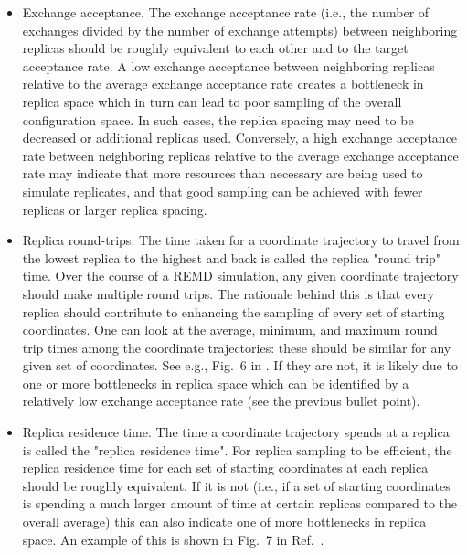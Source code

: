 \begin{itemize}
  \item Exchange acceptance. The exchange acceptance rate (i.e., the number of exchanges divided by the number of exchange attempts) between neighboring replicas should be roughly equivalent to each other and to the target acceptance rate. A low exchange acceptance between neighboring replicas relative to the average exchange acceptance rate creates a bottleneck in replica space which in turn can lead to poor sampling of the overall configuration space.  In such cases, the replica spacing may need to be decreased or additional replicas used.  Conversely, a high exchange acceptance rate between neighboring replicas relative to the average exchange acceptance rate may indicate that more resources than necessary are being used to simulate replicates, and that good sampling can be achieved with fewer replicas or larger replica spacing.  
  \item Replica round-trips. The time taken for a coordinate trajectory to travel from the lowest replica to the highest and back is called the replica "round trip" time. Over the course of a REMD simulation, any given coordinate trajectory should make multiple round trips. The rationale behind this is that every replica should contribute to enhancing the sampling of every set of starting coordinates.  
One can look at the average, minimum, and maximum round trip times among the coordinate trajectories: these should be similar for any given set of coordinates. See e.g., Fig.\ 6 in \citep{Roe2014}. %
If they are not, it is likely due to one or more bottlenecks in replica space which can be identified by a relatively low exchange acceptance rate (see the previous bullet point).
  \item Replica residence time. The time a coordinate trajectory spends at a replica is called the "replica residence time". For replica sampling to be efficient, the replica residence time for each set of starting coordinates at each replica should be roughly equivalent. If it is not (i.e., if a set of starting coordinates is spending a much larger amount of time at certain replicas compared to the overall average) this can also indicate one of more bottlenecks in replica space. An example of this is shown in Fig.\ 7 in Ref.\ \citep{Roe2014}. 

\end{itemize}
